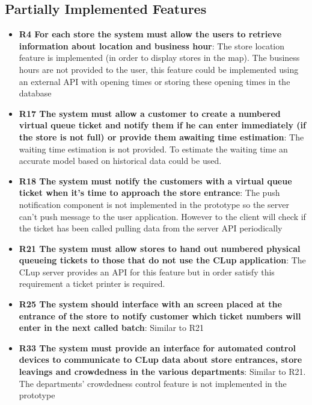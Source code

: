 \subsection{Partially Implemented Features}
\begin{itemize}
    \item \textbf{R4 For each store the system must allow the users to retrieve information about location and business hour}: The store location feature is implemented (in order to display stores in the map). The business hours are not provided to the user, this feature could be implemented using an external API with opening times or storing these opening times in the database
    \item \textbf{R17 The system must allow a customer to create a numbered virtual queue ticket and notify them if he can enter immediately (if the store is not full) or provide them awaiting time estimation}: The waiting time estimation is not provided. To estimate the waiting time an accurate model based on historical data could be used.
    \item \textbf{R18 The system must notify the customers with a virtual queue ticket when it’s time to approach the store entrance}:
    The push notification component is not implemented in the prototype so the server can't push message to the user application. However to the client will check if the ticket has been called pulling data from the server API periodically
    \item \textbf{R21 The system must allow stores to hand out numbered physical queueing tickets to those that do not use the CLup application}:
    The CLup server provides an API for this feature but in order satisfy this requirement a ticket printer is required. 
    \item \textbf{R25 The system should interface with an screen placed at the entrance of the store to notify customer which ticket numbers will enter in the next called batch}:
    Similar to R21
    \item \textbf{R33 The system must provide an interface for automated control devices to communicate to CLup data about store entrances, store leavings and crowdedness in the various departments}: Similar to R21. The departments' crowdedness control feature is not implemented in the prototype



\end{itemize}

